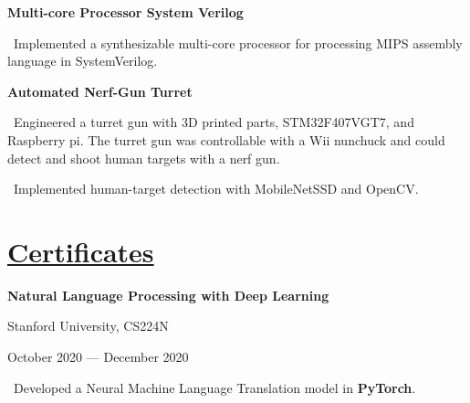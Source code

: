 \documentclass{article}
\begin{document}
\begin{minipage}[t][0pt]{8in\linewidth}
\begin{minipage}[t]{3.1in\linewidth\hspace{2.8em}}
    \vspace{0.4em}

    \small\bfseries\textrm{Multi-core Processor System Verilog}
    
    \vspace{0.3em}
    \small\mdseries
    \hspace{0em}\textasteriskcentered \, \mdseries\textrm{Implemented a synthesizable multi-core processor for processing MIPS assembly language in SystemVerilog.}
    \vspace{0.8em}
    
    \small\bfseries\textrm{Automated Nerf-Gun Turret}
    
    \vspace{0.3em}
    \small\mdseries
    \hspace{0em}\textasteriskcentered \, \mdseries\textrm Engineered a turret gun with 3D printed parts, STM32F407VGT7, and Raspberry pi. The turret gun was controllable with a Wii nunchuck and could detect and shoot human targets with a nerf gun.

    \vspace{0.5em}
    \small\mdseries
    \hspace{0em}\textasteriskcentered \, \mdseries\textrm Implemented human-target detection with MobileNetSSD and OpenCV.

    \vspace{0.5em}     
    \section{\underline{Certificates}}
        \begin{minipage}[t]{3.3in\textwidth\hspace{0in}}    
            
            \vspace{-1.5em}        
            \mdseries\bfseries{Natural Language Processing with Deep Learning}
            
            \hspace{0.4em}\small\mdseries\textrm Stanford University, CS224N
            
            \hspace{0.4em}\small\mdseries\textrm October 2020 — December 2020
            
            \small\mdseries
            \vspace{0.4em}
            \hspace{1em}\textasteriskcentered \, \mdseries\textrm{Developed a Neural Machine Language Translation model in \textbf{PyTorch}.}
            

\end{minipage}
\end{minipage}
\end{minipage}
\end{document}
